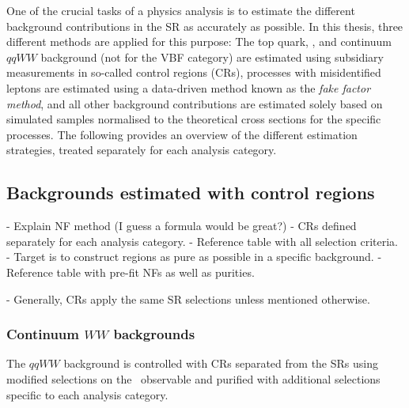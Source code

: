 
One of the crucial tasks of a physics analysis is to estimate the different background contributions in the SR as accurately as possible.
In this thesis, three different methods are applied for this purpose: 
The top quark, \Zjets, and continuum $qqWW$ background (not for the VBF category) are estimated using subsidiary measurements in so-called control regions (CRs), processes with misidentified leptons are estimated using a data-driven method known as the \emph{fake factor method}, and all other background contributions are estimated solely based on simulated samples normalised to the theoretical cross sections for the specific processes.
The following provides an overview of the different estimation strategies, treated separately for each analysis category.

\subsection{Backgrounds estimated with control regions}

- Explain NF method (I guess a formula would be great?)
- CRs defined separately for each analysis category.
- Reference table with all selection criteria.
- Target is to construct regions as pure as possible in a specific background.
- Reference table with pre-fit NFs as well as purities.

- Generally, CRs apply the same SR selections unless mentioned otherwise.

\subsubsection{Continuum $WW$ backgrounds}
The $qqWW$ background is controlled with CRs separated from the SRs using modified selections on the \mll\ observable and purified with additional selections specific to each analysis category.

